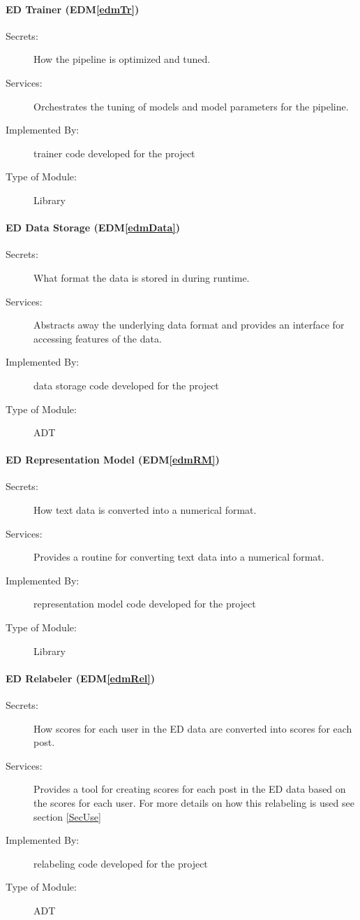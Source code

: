 \documentclass[12pt, titlepage]{article}
\newcommand{\edmref}[1]{EDM\ref{#1}}
\begin{document}
\paragraph{ED Trainer (\edmref{edmTr})}
\begin{description}
\item[Secrets:] How the pipeline is optimized and tuned.
\item[Services:] Orchestrates the tuning of models and model parameters for the pipeline.
\item[Implemented By:] trainer code developed for the project
\item[Type of Module:] Library
\end{description}

\paragraph{ED Data Storage (\edmref{edmData})}
\begin{description}
\item[Secrets:] What format the data is stored in during runtime.
\item[Services:] Abstracts away the underlying data format and provides an interface for accessing features of the data.
\item[Implemented By:] data storage code developed for the project
\item[Type of Module:] ADT
\end{description}

\paragraph{ED Representation Model (\edmref{edmRM})}
\begin{description}
\item[Secrets:] How text data is converted into a numerical format.
\item[Services:] Provides a routine for converting text data into a numerical format.
\item[Implemented By:] representation model code developed for the project
\item[Type of Module:] Library
\end{description}

\paragraph{ED Relabeler (\edmref{edmRel})}
\begin{description}
\item[Secrets:] How scores for each user in the ED data are converted into scores for each post.
\item[Services:] Provides a tool for creating scores for each post in the ED data based on the scores for each user. For more details on how this relabeling is used see section \ref{SecUse}
\item[Implemented By:] relabeling code developed for the project
\item[Type of Module:] ADT
\end{description}
\end{document}
